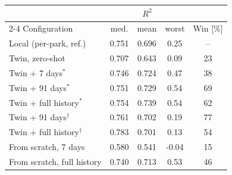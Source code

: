 \begin{tabular}{lcccc}
\toprule
& \multicolumn{3}{c}{$R^2$} & \\
\cmidrule(lr){2-4}
Configuration & med. & mean & worst & Win [\%] \\
\midrule
Local (per-park, ref.) & 0.751 & 0.696 & 0.25 & -- \\
Twin, zero-shot & 0.707 & 0.643 & 0.09 & 23 \\
Twin + 7 days$^{\ast}$ & 0.746 & 0.724 & 0.47 & 38 \\
Twin + 91 days$^{\ast}$ & 0.751 & 0.729 & 0.54 & 69 \\
Twin + full history$^{\ast}$ & 0.754 & 0.739 & 0.54 & 62 \\
Twin + 91 days$^{\dagger}$ & 0.761 & 0.702 & 0.19 & 77 \\
Twin + full history$^{\dagger}$ & 0.783 & 0.701 & 0.13 & 54 \\
From scratch, 7 days & 0.580 & 0.541 & -0.04 & 15 \\
From scratch, full history & 0.740 & 0.713 & 0.53 & 46 \\
\bottomrule
\end{tabular}

